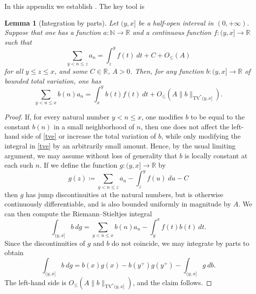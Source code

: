 \documentclass[12pt,a4paper,reqno]{amsart}
\numberwithin{equation}{section}
\theoremstyle{plain}
\newtheorem{lemma}[theorem]{Lemma}
\theoremstyle{definition}
\newcommand\R{\mathbb{R}}
\newcommand\N{\mathbb{N}}
\begin{document}
In this appendix we establish .  The key tool is

\begin{lemma}[Integration by parts]\label{integ-lemma}  Let $(y,x]$ be a half-open interval in $(0,+\infty)$.  Suppose that one has a function $a \colon \N \to \R$ and a continuous function $f: (y,x] \to \R$ such that 
  $$ \sum_{y < n \leq z} a_n = \int_z^y f(t)\ dt + C + O_{\leq}(A)$$
  for all $y \leq z \leq x$, and some $C \in \R$, $A>0$.  Then, for any function $b: (y,x] \to \R$ of bounded total variation, one has
\begin{equation}\label{tve}
   \sum_{y < n \leq x} b(n) a_n = \int_x^y b(t) f(t)\ dt + O_{\leq}(A\|b\|_{\mathrm{TV}^*(y,x]}).
\end{equation}
\end{lemma}

\begin{proof}  If, for every natural number $y < n \leq x$, one modifies $b$ to be equal to the constant $b(n)$ in a small neighborhood of $n$, then one does not affect the left-hand side of \eqref{tve} or increase the total variation of $b$, while only modifying the integral in \eqref{tve} by an arbitrarily small amount.  Hence, by the usual limiting argument, we may assume without loss of generality that $b$ is locally constant at each such $n$.  If we define the function $g \colon (y,x] \to \R$ by
$$ g(z) \coloneqq  \sum_{y < n \leq z} a_n - \int_z^y f(u)\ du - C$$
then $g$ has jump discontinuities at the natural numbers, but is otherwise continuously differentiable, and is also bounded uniformly in magnitude by $A$.  We can then compute the Riemann--Stieltjes integral
$$ \int_{(y,x]} b\ dg = \sum_{y < n \leq x} b(n) a_n - \int_y^x f(t) b(t)\ dt.$$
Since the discontinuities of $g$ and $b$ do not coincide, we may integrate by parts to obtain
$$ \int_{(y,x]} b\ dg = b(x) g(x) - b(y^+) g(y^+) - \int_{(y,x]} g\ db.$$
The left-hand side is $O_{\leq}(A \|b\|_{\mathrm{TV}^*(y,x]})$, and the claim follows.
\end{proof}
\end{document}
